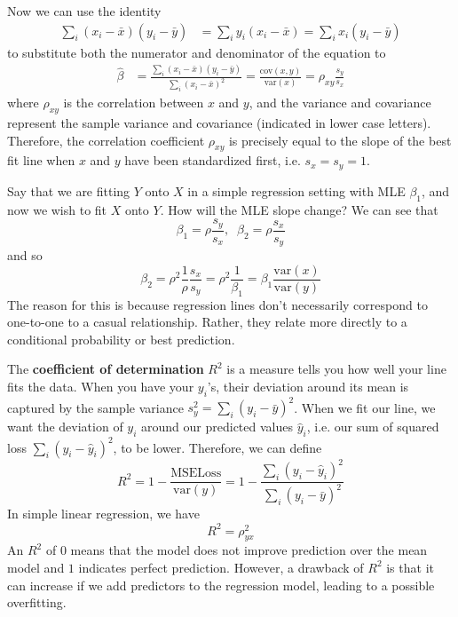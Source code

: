 \documentclass{article}
\begin{document}
    Now we can use the identity
    \begin{align*}
      \sum_{i} (x_i - \bar{x}) (y_i - \bar{y}) & = \sum_i y_i (x_i - \bar{x}) = \sum_i x_i (y_i - \bar{y}) 
    \end{align*}
    to substitute both the numerator and denominator of the equation to 
    \begin{align*}
      \hat{\beta} & = \frac{\sum_i (x_i - \bar{x}) (y_i - \bar{y})}{\sum_i (x_i - \bar{x})^2} = \frac{\mathrm{cov}(x, y)}{\mathrm{var}(x)} = \rho_{xy} \frac{s_y}{s_x}
    \end{align*}
    where $\rho_{xy}$ is the correlation between $x$ and $y$, and the variance and covariance represent the sample variance and covariance (indicated in lower case letters). Therefore, the correlation coefficient $\rho_{xy}$ is precisely equal to the slope of the best fit line when $x$ and $y$ have been standardized first, i.e. $s_x = s_y = 1$. 

    \begin{example}
      Say that we are fitting $Y$ onto $X$ in a simple regression setting with MLE $\beta_1$, and now we wish to fit $X$ onto $Y$. How will the MLE slope change? We can see that 
      \[\beta_1 = \rho \frac{s_y}{s_x} , \;\; \beta_2 = \rho \frac{s_x}{s_y}\]
      and so 
      \[\beta_2 = \rho^2 \frac{1}{\rho} \frac{s_x}{s_y} = \rho^2 \frac{1}{\beta_1} = \beta_1 \frac{\mathrm{var}(x)}{\mathrm{var}(y)}\]
      The reason for this is because regression lines don't necessarily correspond to one-to-one to a casual relationship. Rather, they relate more directly to a conditional probability or best prediction. 
    \end{example}

    The \textbf{coefficient of determination} $R^2$ is a measure tells you how well your line fits the data. When you have your $y_i$'s, their deviation around its mean is captured by the sample variance $s^2_y = \sum_i (y_i - \bar{y})^2$. When we fit our line, we want the deviation of $y_i$ around our predicted values $\hat{y}_i$, i.e. our sum of squared loss $\sum_i (y_i - \hat{y}_i)^2$, to be lower. Therefore, we can define 
    \[R^2 = 1 - \frac{\mathrm{MSE Loss}}{\mathrm{var}(y)} = 1 - \frac{\sum_i (y_i - \hat{y}_i)^2}{\sum_i (y_i - \bar{y})^2}\]
    In simple linear regression, we have 
    \[R^2 = \rho_{yx}^2\]
    An $R^2$ of $0$ means that the model does not improve prediction over the mean model and $1$ indicates perfect prediction. However, a drawback of $R^2$ is that it can increase if we add predictors to the regression model, leading to a possible overfitting. 
\end{document}
